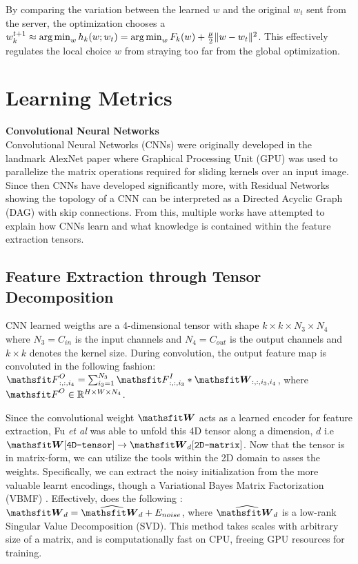 By comparing the variation between the learned $w$ and the original  $w_t$ sent from the server, the optimization chooses a $w_k^{t+1} \approx \operatorname*{arg\,min}_w h_k(w;w_t) = \operatorname*{arg\,min}_w F_k(w) + \frac{\mu}{2}\Vert w - w_t\Vert^2$. This effectively regulates the local choice $w$ from straying too far from the global optimization. 

\section{Learning Metrics}
\textbf{Convolutional Neural Networks}\\
Convolutional Neural Networks (CNNs) were originally developed in the landmark AlexNet paper \cite{krizhevsky2012imagenet} where Graphical Processing Unit (GPU) was used to parallelize the matrix operations required for sliding kernels over an input image. Since then CNNs have developed significantly more, with Residual Networks \cite{he2016deep} showing the topology of a CNN can be interpreted as a Directed Acyclic Graph (DAG) with skip connections. From this, multiple works have attempted to explain how CNNs learn and what knowledge is contained within the feature extraction tensors. 

\subsection{Feature Extraction through Tensor Decomposition}
CNN learned weigths are a 4-dimensional tensor with shape $k\times k \times N_3 \times N_4$ where $N_3 = C_{in}$ is the input channels and $ N_4 = C_{out}$ is the output channels and $k\times k$ denotes the kernel size. During convolution, the output feature map is convoluted in the following fashion: $\etF^{O}_{:,:,i_4} = \sum_{i_3=1}^{N_3}\etF^{I}_{:,:,i_3}\ast\tW_{:,:,i_3,i_4}$, where ${\etF}^{O}\in\mathbb{R}^{H \times W \times N_{4}}$. 

Since the convolutional weight $\tW$ acts as a learned encoder for feature extraction, Fu \textit{et al} \cite{fu2021conet} was able to unfold this 4D tensor along a dimension, $d$ i.e $\tW [\texttt{4D-tensor}] \rightarrow \tW_d [\texttt{2D-matrix}]$. Now that the tensor is in matrix-form, we can utilize the tools within the 2D domain to asses the weights. Specifically, \cite{fu2021conet} we can extract the noisy initialization from the more valuable learnt encodings, though a Variational Bayes Matrix Factorization (VBMF) \cite{nakajima2013global}. Effectively, \cite{fu2021conet} does the following : $\tW_d = \widehat{\tW_d} + E_{noise}$, where $ \widehat{\tW_d}$ is a low-rank Singular Value Decomposition (SVD). This method takes scales with arbitrary size of a matrix, and is computationally fast on CPU, freeing GPU resources for training.

